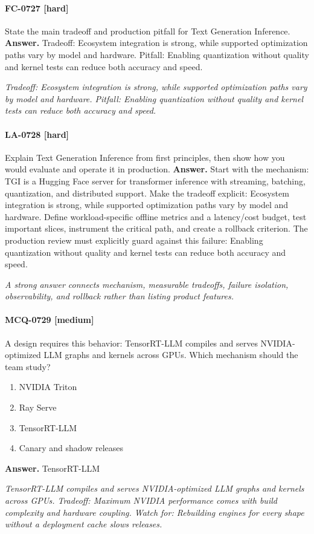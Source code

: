 \paragraph{FC-0727 [hard]} State the main tradeoff and production pitfall for Text Generation Inference.
\noindent\textbf{Answer.} Tradeoff: Ecosystem integration is strong, while supported optimization paths vary by model and hardware. Pitfall: Enabling quantization without quality and kernel tests can reduce both accuracy and speed.
\par\textit{Tradeoff: Ecosystem integration is strong, while supported optimization paths vary by model and hardware. Pitfall: Enabling quantization without quality and kernel tests can reduce both accuracy and speed.}
\paragraph{LA-0728 [hard]} Explain Text Generation Inference from first principles, then show how you would evaluate and operate it in production.
\noindent\textbf{Answer.} Start with the mechanism: TGI is a Hugging Face server for transformer inference with streaming, batching, quantization, and distributed support. Make the tradeoff explicit: Ecosystem integration is strong, while supported optimization paths vary by model and hardware. Define workload-specific offline metrics and a latency/cost budget, test important slices, instrument the critical path, and create a rollback criterion. The production review must explicitly guard against this failure: Enabling quantization without quality and kernel tests can reduce both accuracy and speed.
\par\textit{A strong answer connects mechanism, measurable tradeoffs, failure isolation, observability, and rollback rather than listing product features.}
\paragraph{MCQ-0729 [medium]} A design requires this behavior: TensorRT-LLM compiles and serves NVIDIA-optimized LLM graphs and kernels across GPUs. Which mechanism should the team study?
\begin{enumerate}[label=\Alph*.]
\item NVIDIA Triton
\item Ray Serve
\item TensorRT-LLM
\item Canary and shadow releases
\end{enumerate}
\noindent\textbf{Answer.} TensorRT-LLM
\par\textit{TensorRT-LLM compiles and serves NVIDIA-optimized LLM graphs and kernels across GPUs. Tradeoff: Maximum NVIDIA performance comes with build complexity and hardware coupling. Watch for: Rebuilding engines for every shape without a deployment cache slows releases.}

